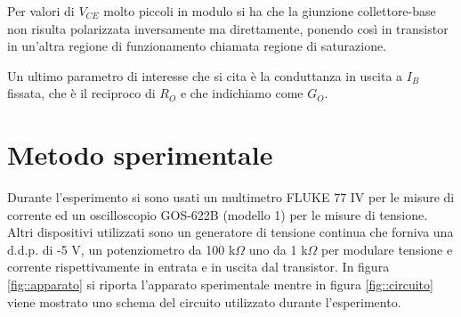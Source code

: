 \documentclass[a4paper,11pt]{article}
\begin{document}
Per valori di $V_{CE}$ molto piccoli in modulo si ha che la giunzione collettore-base non risulta polarizzata inversamente ma direttamente, ponendo così in transistor in un'altra regione di funzionamento chiamata regione di saturazione.

Un ultimo parametro di interesse che si cita è la conduttanza in uscita a $I_B$ fissata, che è il reciproco di $R_O$ e che indichiamo come $G_O$.


\section{Metodo sperimentale}

Durante l'esperimento si sono usati un multimetro FLUKE 77 IV per le misure di corrente ed un oscilloscopio GOS-622B (modello 1) per le misure di tensione. Altri dispositivi utilizzati sono un generatore di tensione continua che forniva una d.d.p. di -5 V, un potenziometro da 100 k$\Omega$ uno da 1 k$\Omega$ per modulare tensione e corrente rispettivamente in entrata e in uscita dal transistor. In figura \ref{fig::apparato} si riporta l'apparato sperimentale mentre in figura \ref{fig::circuito} viene mostrato uno schema del circuito utilizzato durante l'esperimento.
\end{document}
